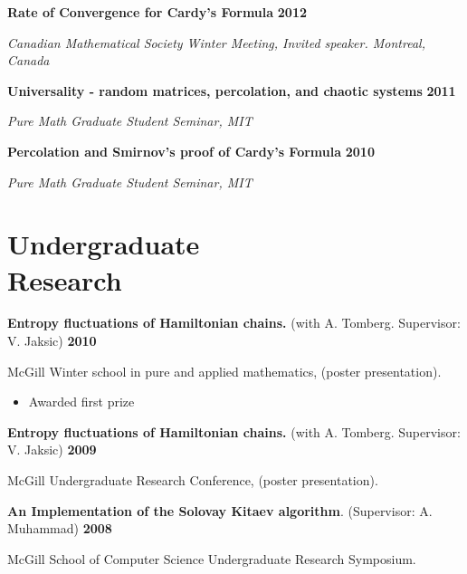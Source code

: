 \documentclass[margin,line]{resume}
\begin{document}
\begin{resume}
\textbf{Rate of Convergence for Cardy's Formula}
\hfill \textbf{2012}%

\vspace{-2.5mm}
      \textit{Canadian Mathematical Society Winter Meeting, Invited speaker. Montreal, Canada}

\vspace{-2.5mm}
\textbf{Universality - random matrices, percolation, and chaotic systems}
\hfill \textbf{2011}%

\vspace{-2.5mm}
      \textit{Pure Math Graduate Student Seminar, MIT}

\vspace{-2.5mm}
\textbf{Percolation and Smirnov's proof of Cardy's Formula}
\hfill \textbf{2010}%

\vspace{-2.5mm}
      \textit{Pure Math Graduate Student Seminar, MIT}
      
      
          \section{\mysidestyle Undergraduate \\ Research}


\noindent \textbf{Entropy fluctuations of Hamiltonian chains.} (with A. Tomberg. Supervisor: V. Jaksic) 
\hfill \textbf{2010}

\vspace{-2.5mm}
McGill Winter school in pure and applied mathematics, (poster presentation).
\vspace{2mm}
\begin{itemize}
\item Awarded first prize
\end{itemize}

 \vspace{-2mm}
\noindent \textbf{Entropy fluctuations of Hamiltonian chains.} (with A. Tomberg. Supervisor: V. Jaksic) 
\hfill \textbf{2009}

\vspace{-2.5mm}
McGill Undergraduate Research Conference, (poster presentation).

\vspace{-2mm}
\noindent \textbf{An Implementation of the Solovay Kitaev algorithm}. (Supervisor: A. Muhammad) 
\hfill\textbf{2008}

\vspace{-2.5mm}
McGill School of Computer Science Undergraduate Research Symposium.
      

\end{resume}
\end{document}
